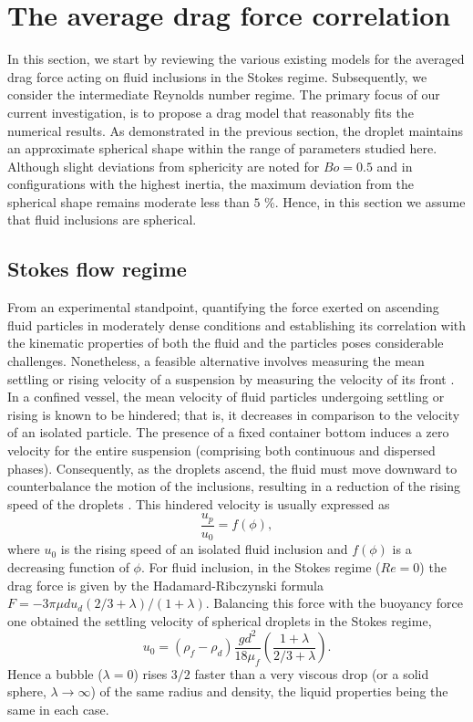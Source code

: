 \section{The average drag force correlation}
\label{sec:model_drag}
In this section, we start by reviewing the various existing models for the averaged drag force acting on fluid inclusions in the Stokes regime. 
Subsequently, we consider the intermediate Reynolds number regime. 
The primary focus of our current investigation, is to propose a drag model that reasonably fits the numerical results. 
As demonstrated in the previous section, the droplet maintains an approximate spherical shape within the range of parameters studied here. 
Although slight deviations from sphericity are noted for $Bo=0.5$ and in configurations with the highest inertia, the maximum deviation from the spherical shape remains moderate less than $5$ \%. 
Hence, in this section we assume that fluid inclusions are spherical.



\subsection{Stokes flow regime}

From an experimental standpoint, quantifying the force exerted on ascending fluid particles in moderately dense conditions and establishing its correlation with the kinematic properties of both the fluid and the particles poses considerable challenges. 
Nonetheless, a feasible alternative involves measuring the mean settling or rising velocity of a suspension by measuring the velocity of its front \citep{guazzelli2011}. 
In a confined vessel, the mean velocity of fluid particles undergoing settling or rising is known to be hindered; that is, it decreases in comparison to the velocity of an isolated particle. 
The presence of a fixed container bottom induces a zero velocity for the entire suspension (comprising both continuous and dispersed phases). 
Consequently, as the droplets ascend, the fluid must move downward to counterbalance the motion of the inclusions, resulting in a reduction of the rising speed of the droplets \citep{guazzelli2011}. 
This hindered velocity is usually expressed as
\begin{equation}
\frac{u_p}{u_0} = f(\phi),
\end{equation}
where $u_0$ is the rising speed of an isolated fluid inclusion and $f(\phi)$ is a decreasing function of $\phi$. 
For fluid inclusion, in the Stokes regime ($Re=0$) the drag force is given by the Hadamard-Ribczynski formula $ F = -3\pi \mu d u_d (2/3+\lambda)/(1+\lambda)$.
Balancing this force with the buoyancy force one obtained the settling velocity of  spherical droplets in the Stokes regime, 
\begin{equation}
    u_0
    = (\rho_f - \rho_d)\frac{g d^2}{18\mu_f}\left(\frac{1+\lambda}{2/3 + \lambda}\right).
    \label{eq:u_o}
\end{equation}
Hence a bubble ($\lambda =0$) rises $3/2$ faster than a very viscous drop (or a solid sphere, $\lambda \to\infty$) of the same radius and density, the liquid properties being the same in each case.

